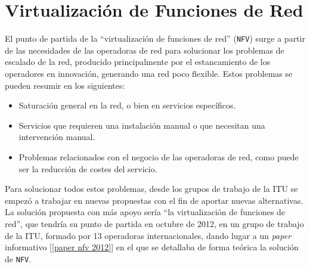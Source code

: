\documentclass[a4paper, oneside, 12pt]{book}
\begin{document}
	
	\pagebreak
	
	\chapter{Virtualización de Funciones de Red}
	\label{sec: nfv}
	\noindent El punto de partida de la ``virtualización de funciones de red'' (\texttt{NFV}) surge a partir de las necesidades de las operadoras de red para solucionar los problemas de escalado de la red, producido principalmente por el estancamiento de los operadores en innovación, generando una red poco flexible. Estos problemas se pueden resumir en los siguientes:
	\begin{itemize}
		\item Saturación general en la red, o bien en servicios específicos.
		\item Servicios que requieren una instalación manual o que necesitan una intervención manual.
		\item Problemas relacionados con el negocio de las operadoras de red, como puede ser la reducción de costes del servicio.
	\end{itemize}
	

	\noindent Para solucionar todos estos problemas, desde los grupos de trabajo de la ITU se empezó a trabajar en nuevas propuestas con el fin de aportar nuevas alternativas. La solución propuesta con más apoyo sería ``la virtualización de funciones de red'', que tendría su punto de partida en octubre de 2012, en un grupo de trabajo de la ITU, formado por 13 operadoras internacionales, dando lugar a un \textit{paper} informativo [\ref{paper nfv 2012}] en el que se detallaba de forma teórica la solución de \texttt{NFV}. \\
	
\end{document}
